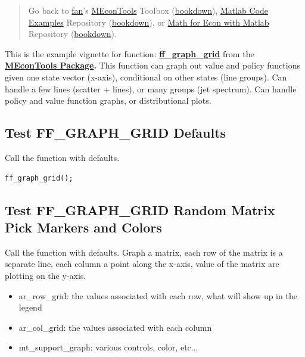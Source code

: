 \documentclass[
]{book}
\begin{document}
\begin{quote}
Go back to \href{http://fanwangecon.github.io/}{fan}'s \href{https://fanwangecon.github.io/MEconTools/}{MEconTools} Toolbox (\href{https://fanwangecon.github.io/MEconTools/bookdown}{bookdown}), \href{https://fanwangecon.github.io/M4Econ/}{Matlab Code Examples} Repository (\href{https://fanwangecon.github.io/M4Econ/bookdown}{bookdown}), or \href{https://fanwangecon.github.io/Math4Econ/}{Math for Econ with Matlab} Repository (\href{https://fanwangecon.github.io/Math4Econ/bookdown}{bookdown}).
\end{quote}

This is the example vignette for function:
\href{https://github.com/FanWangEcon/MEconTools/blob/master/MEconTools/graph/ff_graph_grid.m}{\textbf{ff\_graph\_grid}}
from the \href{https://fanwangecon.github.io/MEconTools/}{\textbf{MEconTools
Package}}\textbf{.} This function
can graph out value and policy functions given one state vector
(x-axis), conditional on other states (line groups). Can handle a few
lines (scatter + lines), or many groups (jet spectrum). Can handle
policy and value function graphs, or distributional plots.

\hypertarget{test-ff_graph_grid-defaults}{%
\subsection{Test FF\_GRAPH\_GRID Defaults}\label{test-ff_graph_grid-defaults}}

Call the function with defaults.

\begin{verbatim}
ff_graph_grid();
\end{verbatim}

\hypertarget{test-ff_graph_grid-random-matrix-pick-markers-and-colors}{%
\subsection{Test FF\_GRAPH\_GRID Random Matrix Pick Markers and Colors}\label{test-ff_graph_grid-random-matrix-pick-markers-and-colors}}

Call the function with defaults. Graph a matrix, each row of the matrix
is a separate line, each column a point along the x-axis, value of the
matrix are plotting on the y-axis.

\begin{itemize}
\item
  ar\_row\_grid: the values associated with each row, what will show
  up in the legend
\item
  ar\_col\_grid: the values associated with each column
\item
  mt\_support\_graph: various controls, color, etc...
\end{itemize}
\end{document}
